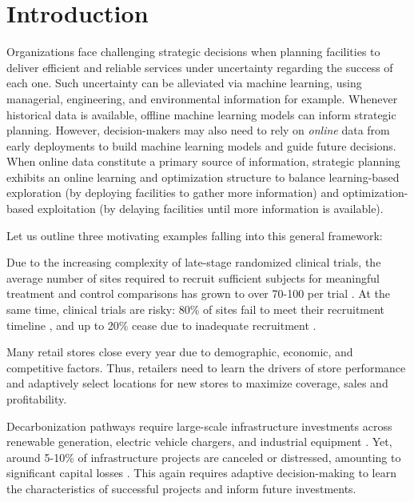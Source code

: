 \documentclass[nonblindrev]{informs3noheader}
\begin{document}
\vspace{-12pt}
\section{Introduction}

Organizations face challenging strategic decisions when planning facilities to deliver efficient and reliable services under uncertainty regarding the success of each one. Such uncertainty can be alleviated via machine learning, using managerial, engineering, and environmental information for example. Whenever historical data is available, offline machine learning models can inform strategic planning. However, decision-makers may also need to rely on \textit{online} data from early deployments to build machine learning models and guide future decisions. When online data constitute a primary source of information, strategic planning exhibits an online learning and optimization structure to balance learning-based exploration (by deploying facilities to gather more information) and optimization-based exploitation (by delaying facilities until more information is available).

Let us outline three motivating examples falling into this general framework:
\begin{example}
Due to the increasing complexity of late-stage randomized clinical trials, the average number of sites required to recruit sufficient subjects for meaningful treatment and control comparisons has grown to over 70-100 per trial \citep{brogger2022changes, basubenchmarking}. At the same time, clinical trials are risky: 80\% of sites fail to meet their recruitment timeline \citep{johnson2015evidence}, and up to 20\% cease due to inadequate recruitment \citep{carlisle2015unsuccessful}.
\end{example}
\begin{example}
Many retail stores close every year due to demographic, economic, and competitive factors. Thus, retailers need to learn the drivers of store performance and adaptively select locations for new stores to maximize coverage, sales and profitability.
\end{example}
\begin{example}
Decarbonization pathways require large-scale infrastructure investments across renewable generation, electric vehicle chargers, and industrial equipment \citep{national2021accelerating}. Yet, around 5-10\% of infrastructure projects are canceled or distressed, amounting to significant capital losses \citep{sakhrani2015negotiated}. This again requires adaptive decision-making to learn the characteristics of successful projects and inform future investments.
\end{example}
\end{document}
